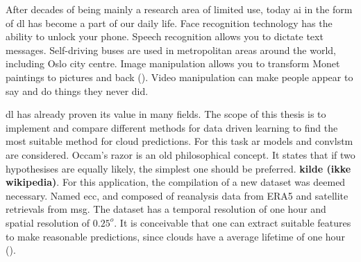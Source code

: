 


After decades of being mainly a research area of limited use, today \acrfull{ai} in the form of \acrfull{dl} has become a part of our daily life. Face recognition technology has the ability to unlock your phone. Speech recognition allows you to dictate text messages. Self-driving buses are used in metropolitan areas around the world, including Oslo city centre. Image manipulation allows you to transform Monet paintings to pictures and back (\cite{zhu2017_cycleGAN_monet_zebra}). Video manipulation can make people appear to say and do things they never did. 

\acrshort{dl} has already proven its value in many fields. The scope of this thesis is to implement and compare different methods for data driven learning to find the most suitable method for cloud predictions. For this task \acrfull{ar} models and \acrfull{convlstm} are considered. 
Occam's razor is an old philosophical concept. It states that if two hypothesises are equally likely, the simplest one should be preferred. \textbf{kilde (ikke wikipedia)}. For this application, the compilation of a new dataset was deemed necessary. Named \acrfull{ecc}, and composed of reanalysis data from ERA5 and satellite retrievals from \acrfull{msg}. The dataset has a temporal resolution of one hour and spatial resolution of $0.25^o$. It is conceivable that one can extract suitable features to make reasonable predictions, since clouds have a average lifetime of one hour (\cite{lohmann2016}). 


